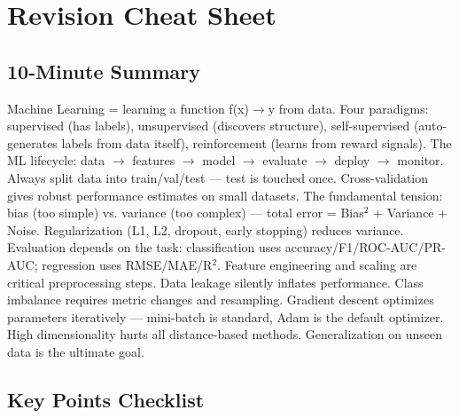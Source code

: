\documentclass[11pt]{article}
\begin{document}
\section{Revision Cheat Sheet}\label{revision-cheat-sheet}

\subsection{10-Minute Summary}\label{10-minute-summary}

Machine Learning = learning a function f(x)\(\rightarrow\)y from data. Four paradigms: supervised (has labels), unsupervised (discovers structure), self-supervised (auto-generates labels from data itself), reinforcement (learns from reward signals). The ML lifecycle: data \(\rightarrow\) features \(\rightarrow\) model \(\rightarrow\) evaluate \(\rightarrow\) deploy \(\rightarrow\) monitor. Always split data into train/val/test --- test is touched once. Cross-validation gives robust performance estimates on small datasets. The fundamental tension: bias (too simple) vs. variance (too complex) --- total error = Bias\(^2\) + Variance + Noise. Regularization (L1, L2, dropout, early stopping) reduces variance. Evaluation depends on the task: classification uses accuracy/F1/ROC-AUC/PR-AUC; regression uses RMSE/MAE/R\(^2\). Feature engineering and scaling are critical preprocessing steps. Data leakage silently inflates performance. Class imbalance requires metric changes and resampling. Gradient descent optimizes parameters iteratively --- mini-batch is standard, Adam is the default optimizer. High dimensionality hurts all distance-based methods. Generalization on unseen data is the ultimate goal.

\subsection{Key Points Checklist}\label{key-points-checklist}
\end{document}
